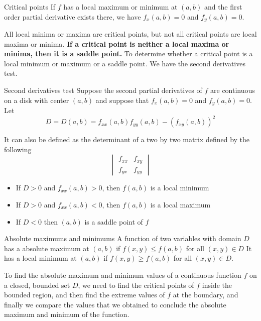 \documentclass{article}
\begin{document}
	\begin{mybox}
		{Critical points} If $f$ has a local maximum or minimum at $(a,b)$ and the first
		order partial derivative exists there, we have $f_{x}(a,b) = 0$ and
		$f_{y}(a,b) = 0$.
	\end{mybox}
	All local minima or maxima are critical points, but not all critical points are
	local maxima or minima. \textbf{If a critical point is neither a local maxima
	or minima, then it is a saddle point.} To determine whether a critical point is
	a local minimum or maximum or a saddle point. We have the second derivatives
	test.
	\begin{mybox}
		{Second derivatives test} Suppose the second partial derivatives of $f$ are continuous
		on a disk with center $(a,b)$ and suppose that $f_{x}(a,b)=0$ and $f_{y}(a,b)
		=0$. Let
		\[
			D=D(a,b)=f_{xx}(a,b)f_{yy}(a,b) - (f_{xy}(a,b))^{2}
		\]
	\end{mybox}
	It can also be defined as the determinant of a two by two matrix defined by the
	following
	\[
		\begin{vmatrix}
			f_{xx} & f_{xy} \\
			f_{yx} & f_{yy}
		\end{vmatrix}
	\]
	\begin{itemize}
		\item If $D>0$ and $f_{xx}(a,b) > 0$, then $f(a,b)$ is a local minimum

		\item If $D>0$ and $f_{xx}(a,b) < 0$, then $f(a,b)$ is a local maximum

		\item If $D<0$ then $(a,b)$ is a saddle point of $f$
	\end{itemize}
	\begin{mybox}
		{Absolute maximums and minimums} A function of two variables with domain $D$
		has a absolute maximum at $(a,b)$ if $f(x,y) \leq f(a,b)$ for all $(x,y) \in
		D$ It has a local minimum at $(a,b)$ if $f(x,y) \geq f(a,b)$ for all $(x,y) \in
		D$.
	\end{mybox}
	To find the absolute maximum and minimum values of a continuous function $f$ on
	a closed, bounded set $D$, we need to find the critical points of $f$ inside the
	bounded region, and then find the extreme values of $f$ at the boundary, and finally
	we compare the values that we obtained to conclude the absolute maximum and minimum
	of the function.
\end{document}
